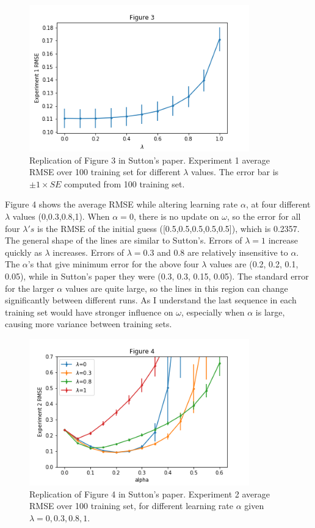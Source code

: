 \documentclass[conference]{IEEEtran}
\begin{document}
	\begin{figure}
		\includegraphics[height=2.5in]{figure3.png} 
		\caption{Replication of Figure 3 in Sutton's paper. Experiment 1 average RMSE over 100 training set for different $\lambda$ values. The error bar is $\pm 1\times SE$ computed from 100 training set.}
		\label{fig:3}
	\end{figure}
	
	Figure 4 shows the average RMSE while altering learning rate $\alpha$, at four different $\lambda$ values (0,0.3,0.8,1). When $\alpha=0$, there is no update on $\omega$, so the error for all four $\lambda's$ is the RMSE of the initial guess ([0.5,0.5,0.5,0.5,0.5]), which is 0.2357. The general shape of the lines are similar to Sutton's. Errors of $\lambda=1$ increase quickly as $\lambda$ increases. Errors of $\lambda = 0.3$ and $0.8$ are relatively insensitive to $\alpha$. The $\alpha$'s that give minimum error for the above four $\lambda$ values are (0.2, 0.2, 0.1, 0.05), while in Sutton's paper they were (0.3, 0.3, 0.15, 0.05). The standard error for the larger $\alpha$ values are quite large, so the lines in this region can change significantly between different runs. As I understand the last sequence in each training set would have stronger influence on $\omega$, especially when $\alpha$ is large, causing more variance between training sets.
	
	\begin{figure}
		\includegraphics[height=2.5in]{figure4.png} 
		\caption{Replication of Figure 4 in Sutton's paper. Experiment 2 average RMSE over 100 training set, for different learning rate $\alpha$ given $\lambda = 0,0.3,0.8,1$.}
		\label{fig:3}
	\end{figure}
	
\end{document}
